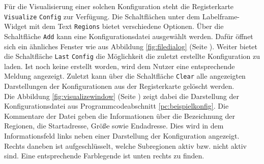 Für die Visualisierung einer solchen Konfiguration steht die Registerkarte \verb*|Visualize| \verb*|Config| zur Verfügung.
Die Schaltflächen unter dem Labelframe-Widget mit dem Text \verb*|Regions| bietet verschiedene Optionen.
Über die Schaltfläche \verb*|Add| kann eine Konfigurationsdatei ausgewählt werden.
Dafür öffnet sich ein ähnliches Fenster wie aus Abbildung \ref{fig:filedialog} (Seite \pageref{fig:filedialog}).
Weiter bietet die Schaltfläche \verb*|Last| \verb*|Config| die Möglichkeit die zuletzt erstellte Konfiguration zu laden.
Ist noch keine erstellt worden, wird dem Nutzer eine entsprechende Meldung angezeigt.
Zuletzt kann über die Schaltfläche \verb*|Clear| alle angezeigten Darstellungen der Konfigurationen aus der Registerkarte gelöscht werden. \\

Die Abbildung \ref{fig:visualizewindow} (Seite \pageref{fig:visualizewindow}) zeigt dabei die Darstellung der Konfigurationsdatei aus Programmcodeabschnitt \ref{pc:beispielkonfig}.
Die Kommentare der Datei geben die Informationen über die Bezeichnung der Regionen, die Startadresse, Größe sowie Endadresse.
Dies wird in dem Informationsfeld links neben einer Darstellung der Konfiguration angezeigt.
Rechts daneben ist aufgeschlüsselt, welche Subregionen aktiv bzw. nicht aktiv sind.
Eine entsprechende Farblegende ist unten rechts zu finden.